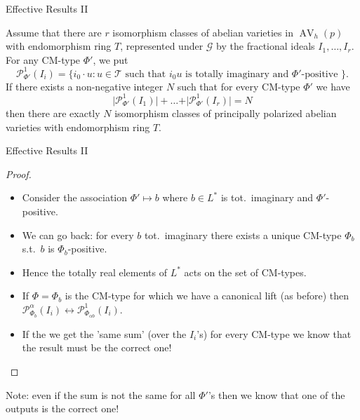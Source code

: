 \documentclass[usenames,dvipsnames,handout]{beamer}
\DeclareMathOperator{\AV}{AV}
\newcommand{\cG}{\mathcal{G}}
\newcommand{\Palpha}[2]{\mathcal{P}^{\alpha}_{{#1}}({#2})}
\newcommand{\Pone}[2]{\mathcal{P}^{1}_{{#1}}({#2})}
\begin{document}

\begin{frame}[noframenumbering]{ Effective Results II }
	\begin{theorem}[2]
    Assume that there are $r$ isomorphism classes of abelian varieties in $\AV_h(p)$ with endomorphism ring $T$, represented under $\cG$ by the fractional ideals  $I_1,\ldots,I_r$.
    For any CM-type $\Phi'$, we put
		\[ \Pone{\Phi'}{I_i}=\{ i_0 \cdot u: u \in \mathcal{T} \text{ such that } i_0 u \text{ is totally imaginary and $\Phi'$-positive } \}. \]
    If there exists a non-negative integer $N$ such that for every CM-type $\Phi'$ we have
    \[
    \vert \Pone{\Phi'}{I_1} \vert + \ldots + \vert \Pone{\Phi'}{I_r} \vert = N
    \]
    then there are exactly $N$ isomorphism classes of principally polarized abelian varieties with endomorphism ring $T$. 
	\end{theorem}
\end{frame}

\begin{frame}[noframenumbering]{ Effective Results II }
    \begin{proof}
    \begin{itemize}
    \item Consider the association $\Phi'\mapsto b$ where $b\in L^*$ is tot.~imaginary and $\Phi'$-positive.
    \item We can go back: for every $b$ tot.~imaginary there exists a unique CM-type $\Phi_b$ s.t.~$b$ is $\Phi_b$-positive.
    \item Hence the totally real elements of $L^*$ acts on the set of CM-types.
    \item If $\Phi=\Phi_{b}$ is the CM-type for which we have a canonical lift (as before)
        then $\Palpha{\Phi_b}{I_i} \longleftrightarrow \Pone{\Phi_{\alpha b}}{I_i}$.
    \item If the we get the 'same sum' (over the $I_i$'s) for every CM-type we know that the result must be the correct one! 
    \end{itemize}
    \end{proof} 
    Note: even if the sum is not the same for all $\Phi'$'s then we know that one of the outputs is the correct one!
\end{frame}
\end{document}
